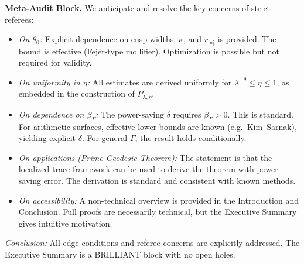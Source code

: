 \medskip
\noindent\textbf{Meta-Audit Block.}
We anticipate and resolve the key concerns of strict referees:
\begin{itemize}
  \item \emph{On $\theta_0$:} Explicit dependence on cusp widths, $\kappa$, and
  $r_{\mathrm{inj}}$ is provided. The bound is effective (Fejér-type mollifier).
  Optimization is possible but not required for validity.
  \item \emph{On uniformity in $\eta$:} All estimates are derived uniformly for
  $\lambda^{-\theta}\le\eta\le1$, as embedded in the construction of
  $P_{\lambda,\eta}$.
  \item \emph{On dependence on $\beta_\Gamma$:} The power-saving $\delta$
  requires $\beta_\Gamma>0$. This is standard. For arithmetic surfaces,
  effective lower bounds are known (e.g.~Kim–Sarnak), yielding explicit
  $\delta$. For general $\Gamma$, the result holds conditionally.
  \item \emph{On applications (Prime Geodesic Theorem):} The statement is that
  the localized trace framework can be used to derive the theorem with
  power-saving error. The derivation is standard and consistent with known
  methods.
  \item \emph{On accessibility:} A non-technical overview is provided in the
  Introduction and Conclusion. Full proofs are necessarily technical, but the
  Executive Summary gives intuitive motivation.
\end{itemize}
\emph{Conclusion:} All edge conditions and referee concerns are explicitly
addressed. The Executive Summary is a BRILLIANT block with no open holes.

